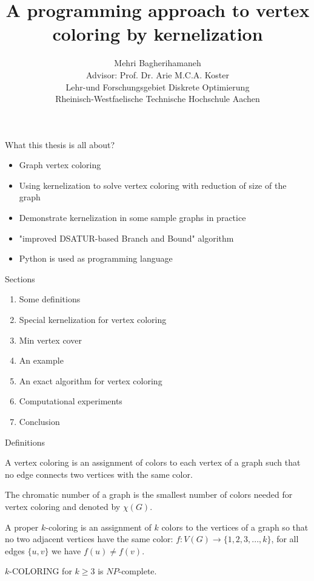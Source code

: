 \documentclass{beamer}
\title{A programming approach to vertex coloring by kernelization}
\author{{Mehri Bagherihamaneh}\\[1cm]{\small {Advisor: Prof. Dr. Arie M.C.A. Koster}}\\[.5cm]{\small {Lehr-und Forschungsgebiet Diskrete Optimierung}}\\ {\small {Rheinisch-Westfaelische Technische Hochschule Aachen}}}
\begin{document}
\begin{frame}
  \titlepage
\end{frame}


\begin{frame}{What this thesis is all about?}
\begin{itemize}

\item Graph vertex coloring
\pause
\item Using kernelization to solve vertex coloring with reduction of size of the  graph
\pause
\item Demonstrate kernelization in some sample graphs in practice
\pause
\item "improved DSATUR-based Branch and Bound" algorithm
\pause
\item Python is used as programming language

\end{itemize}
\end{frame}

\begin{frame}{Sections}


\begin{enumerate}
\item Some definitions
\pause
\item Special kernelization for vertex coloring
\pause

\item Min vertex cover
\pause
\item An example
\pause
\item An exact algorithm for vertex coloring
\pause
\item Computational experiments
\pause
\item Conclusion
\end{enumerate}
\end{frame}



\begin{frame}{Definitions}


\begin{definition}
A \color{red} vertex coloring \color{black} is an assignment of colors to each vertex of a graph such that no edge connects two vertices with the same  color.
\end{definition}
\pause
\begin{definition}
The \color{red} chromatic number \color{black} of a graph is the smallest number of colors needed for vertex coloring and denoted by $\chi(G)$. 
\end{definition}
\pause
\begin{definition}
A \color{red} proper $k$-coloring \color{black} is an assignment of $k$ colors to the vertices of a graph so that no two adjacent vertices have the same color: $f: V(G) \to \{1, 2, 3, . . . , k\}$, for all edges $\{u, v\}$ we have $f(u) \not= f(v)$.
\end{definition}
\pause
\begin{theorem}
$k$-COLORING for $k \geq 3$ is $NP$-complete.
\end{theorem}
\end{frame}
\end{document}
